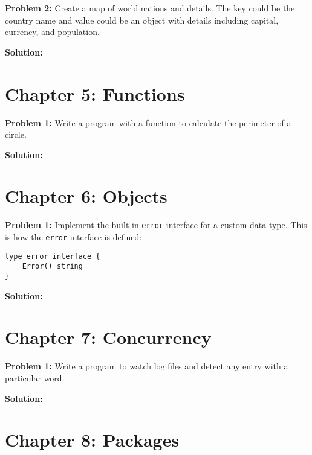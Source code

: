 

\textbf{Problem 2:} Create a map of world nations and details. The key could
be the country name and value could be an object with details including capital,
currency, and population.

\textbf{Solution:}



\section*{Chapter 5: Functions}

\textbf{Problem 1:} Write a program with a function to calculate the perimeter of a circle.

\textbf{Solution:}



\section*{Chapter 6: Objects}

\textbf{Problem 1:} Implement the built-in \texttt{error} interface for a custom data type.  This is how the \texttt{error} interface is defined:

\begin{lstlisting}[numbers=none]
type error interface {
    Error() string
}
\end{lstlisting}

\textbf{Solution:}



\section*{Chapter 7: Concurrency}

{\bfseries Problem 1:} Write a program to watch log files and detect
any entry with a particular word.

\textbf{Solution:}



\section*{Chapter 8: Packages}

